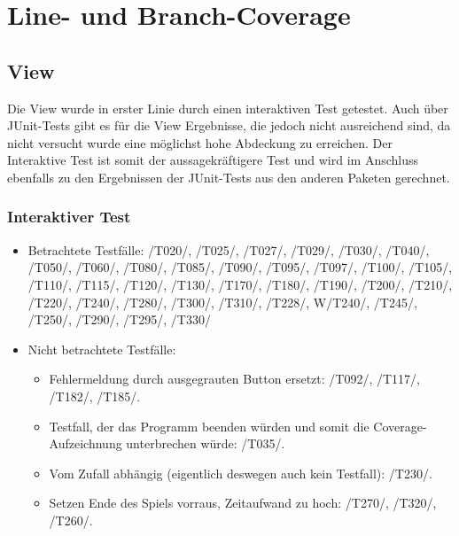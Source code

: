 \documentclass[a4paper]{article}
\begin{document}
\section{Line- und Branch-Coverage}
	\subsection{View}
	Die View wurde in erster Linie durch einen interaktiven Test getestet. Auch über JUnit-Tests gibt es für die View Ergebnisse, die jedoch nicht ausreichend sind, da nicht versucht wurde eine möglichst hohe Abdeckung zu erreichen.
Der Interaktive Test ist somit der aussagekräftigere Test und wird im Anschluss ebenfalls zu den Ergebnissen der JUnit-Tests aus den anderen Paketen gerechnet.
	\subsubsection{Interaktiver Test}
	\begin{itemize}
	\item Betrachtete Testfälle:
	/T020/, /T025/, /T027/, /T029/, /T030/, /T040/, /T050/, /T060/, /T080/, /T085/, /T090/, /T095/, /T097/, /T100/, /T105/, 		/T110/, /T115/, /T120/, /T130/, /T170/, /T180/, /T190/, /T200/, /T210/, /T220/, /T240/, /T280/, /T300/, /T310/, /T228/, 		W/T240/, /T245/,  /T250/, /T290/, /T295/, /T330/  \\
	\item Nicht betrachtete Testfälle: \\
	\begin{itemize}
	\item Fehlermeldung durch ausgegrauten Button ersetzt: /T092/, /T117/, /T182/, /T185/. \\
	\item Testfall, der das Programm beenden würden und somit die Coverage-Aufzeichnung unterbrechen würde: /T035/. \\
	\item Vom Zufall abhängig (eigentlich deswegen auch kein Testfall): /T230/. \\
	\item Setzen Ende des Spiels vorraus, Zeitaufwand zu hoch: /T270/, /T320/, /T260/. \\
	\end{itemize}
	\end{itemize}
	
\end{document}
